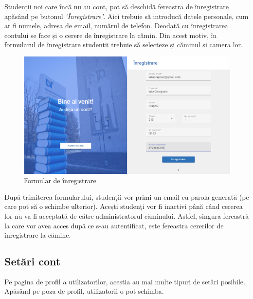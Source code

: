 \documentclass[12pt,a4paper]{report}
\theoremstyle{definition}
\theoremstyle{remark}
\begin{document}
\par Studenții noi care încă nu au cont, pot să deschidă fereastra de înregistrare apăsând pe butonul \textit{`Înregistrare'}. Aici trebuie să introducă datele personale, cum ar fi numele, adresa de email, numărul de telefon. Deodată cu înregistrarea contului se face și o cerere de înregistrare la cămin. Din acest motiv, în formularul de înregistrare studenții trebuie să selecteze și căminul și camera lor.


\begin{figure}[H]
    \centering
    \includegraphics[width=1\linewidth]{resurse/ghid_utilizare/inregistrare.png}
    \caption{Formular de înregistrare}
\end{figure}

\par După trimiterea formularului, studenții vor primi un email cu parola generată (pe care pot să o schimbe ulterior). Acești studenți vor fi inactivi până când cererea lor nu va fi acceptată de  către administratorul căminului. Astfel, singura fereastră la care vor avea acces după ce s-au autentificat, este fereastra cererilor de înregistrare la cămine.

\subsection{Setări cont}

\par Pe pagina de profil a utilizatorilor, aceștia au mai multe tipuri de setări posibile. Apăsând pe poza de profil, utilizatorii o pot schimba.
\end{document}
